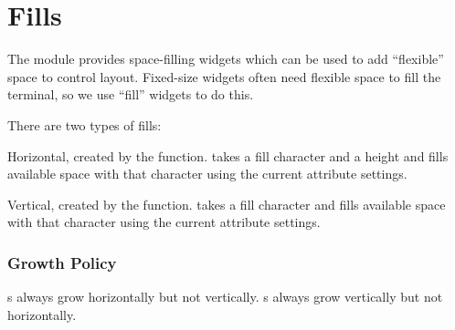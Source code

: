 \section{Fills}

The  module provides space-filling widgets which can be used
to add ``flexible'' space to control layout.  Fixed-size widgets often
need flexible space to fill the terminal, so we use ``fill'' widgets
to do this.

There are two types of fills:

\begin{haskellcode}
\item Horizontal, created by the  function.  
  takes a fill character and a height and fills available space with
  that character using the current attribute settings.
\item Vertical, created by the  function.   takes
  a fill character and fills available space with that character using
  the current attribute settings.
\end{haskellcode}

\subsubsection{Growth Policy}

s always grow horizontally but not vertically.  s
always grow vertically but not horizontally.
